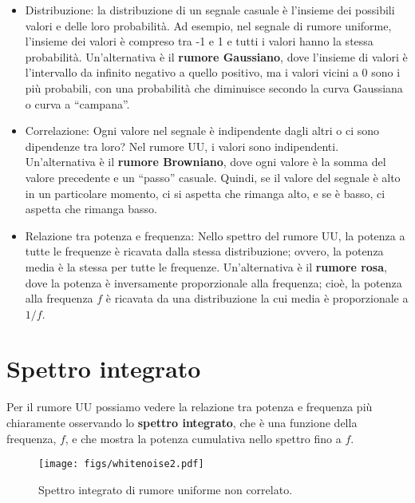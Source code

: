 \documentclass[12pt,a4paper]{book}
\begin{document}
\begin{itemize} 

\item Distribuzione: la distribuzione di un segnale casuale è l'insieme dei possibili valori e delle loro probabilità. Ad esempio, nel segnale di rumore uniforme, l'insieme dei valori è compreso tra -1 e 1 e tutti i valori hanno la stessa probabilità. Un'alternativa è il {\bf rumore Gaussiano}, dove l'insieme di valori è l'intervallo da infinito negativo a quello positivo, ma i valori vicini a 0 sono i più probabili, con una probabilità che diminuisce secondo la curva Gaussiana o curva a ``campana''.

\item Correlazione: Ogni valore nel segnale è indipendente dagli altri o ci sono dipendenze tra loro? Nel rumore UU, i valori sono indipendenti. Un'alternativa è il {\bf rumore Browniano}, dove ogni valore è la somma del valore precedente e un ``passo'' casuale. Quindi, se il valore del segnale è alto in un particolare momento, ci si aspetta che rimanga alto, e se è basso, ci aspetta che rimanga basso.

\item Relazione tra potenza e frequenza: Nello spettro del rumore UU, la potenza a tutte le frequenze è ricavata dalla stessa distribuzione; ovvero, la potenza media è la stessa per tutte le frequenze. Un'alternativa è il {\bf rumore rosa}, dove la potenza è inversamente proporzionale alla frequenza; cioè, la potenza alla frequenza $f$ è ricavata da una distribuzione la cui media è proporzionale a $1/f$.

\end{itemize} 

\section{Spettro integrato} 

Per il rumore UU possiamo vedere la relazione tra potenza e frequenza più chiaramente osservando lo {\bf spettro integrato}, che è una funzione della frequenza, $f$, e che mostra la potenza cumulativa nello spettro fino a $f$.

\begin{figure} 

\centerline{\texttt{[image: figs/whitenoise2.pdf]}} \caption{Spettro integrato di rumore uniforme non correlato.} \label{fig.whitenoise2} \end{figure} 
\end{document}
